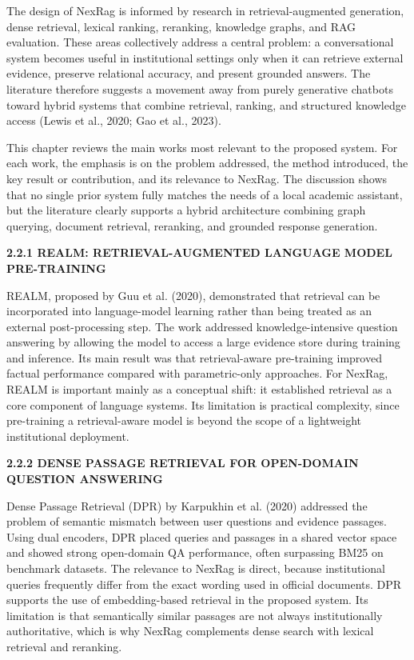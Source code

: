 \newpage
{}
\label{chap:literature-review}

\label{sec:literature-introduction}

\fontsize{12}{14}\selectfont

The design of NexRag is informed by research in retrieval-augmented generation, dense retrieval, lexical ranking, reranking, knowledge graphs, and RAG evaluation. These areas collectively address a central problem: a conversational system becomes useful in institutional settings only when it can retrieve external evidence, preserve relational accuracy, and present grounded answers. The literature therefore suggests a movement away from purely generative chatbots toward hybrid systems that combine retrieval, ranking, and structured knowledge access (Lewis et al., 2020; Gao et al., 2023).

This chapter reviews the main works most relevant to the proposed system. For each work, the emphasis is on the problem addressed, the method introduced, the key result or contribution, and its relevance to NexRag. The discussion shows that no single prior system fully matches the needs of a local academic assistant, but the literature clearly supports a hybrid architecture combining graph querying, document retrieval, reranking, and grounded response generation.

\label{sec:literature-related-works}

\noindent\textbf{2.2.1 REALM: RETRIEVAL-AUGMENTED LANGUAGE MODEL PRE-TRAINING}

REALM, proposed by Guu et al. (2020), demonstrated that retrieval can be incorporated into language-model learning rather than being treated as an external post-processing step. The work addressed knowledge-intensive question answering by allowing the model to access a large evidence store during training and inference. Its main result was that retrieval-aware pre-training improved factual performance compared with parametric-only approaches. For NexRag, REALM is important mainly as a conceptual shift: it established retrieval as a core component of language systems. Its limitation is practical complexity, since pre-training a retrieval-aware model is beyond the scope of a lightweight institutional deployment.

\noindent\textbf{2.2.2 DENSE PASSAGE RETRIEVAL FOR OPEN-DOMAIN QUESTION ANSWERING}

Dense Passage Retrieval (DPR) by Karpukhin et al. (2020) addressed the problem of semantic mismatch between user questions and evidence passages. Using dual encoders, DPR placed queries and passages in a shared vector space and showed strong open-domain QA performance, often surpassing BM25 on benchmark datasets. The relevance to NexRag is direct, because institutional queries frequently differ from the exact wording used in official documents. DPR supports the use of embedding-based retrieval in the proposed system. Its limitation is that semantically similar passages are not always institutionally authoritative, which is why NexRag complements dense search with lexical retrieval and reranking.

